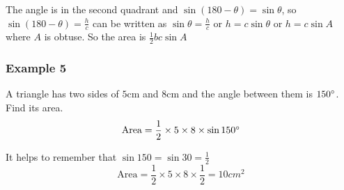    
\setlength\fboxrule{0in}\setlength\fboxsep{0.2in}


The angle is in the second quadrant and $\sin  (180 -\theta ) =\sin  \theta $, so $\sin  (180 -\theta ) =\frac{h}{c}$ can be written as $\sin  \theta  =\frac{h}{c}$ or $h =c \sin  \theta $ or $h =c \sin  A$ where $A$ is obtuse. So the area is $\frac{1}{2} b c \sin  A$ 

\subsubsection{Example 5}
A triangle has two sides of $5 \mbox{cm}$ and $8 \mbox{cm}$ and the angle between them is $150 \mbox{{\ensuremath{{}^\circ}}}$. Find its area.
\begin{equation*}\text{Area} =\frac{1}{2} \times 5 \times 8 \times \sin  150 \mbox{{\ensuremath{{}^\circ}}}
\end{equation*}

It helps to remember that $\sin  150 =\sin  30 =\frac{1}{2}$
\begin{equation*}\text{Area} =\frac{1}{2} \times 5 \times 8 \times \frac{1}{2} =10 cm^{2}
\end{equation*}

